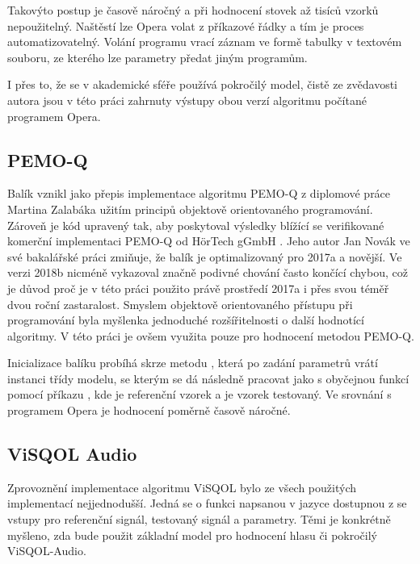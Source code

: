 Takovýto postup je časově náročný a při hodnocení stovek až tisíců vzorků nepoužitelný. Naštěstí lze Opera volat z příkazové řádky a tím je proces automatizovatelný. Volání programu  vrací záznam ve formě tabulky v textovém souboru, ze kterého lze parametry předat jiným programům.

I přes to, že se v akademické sféře používá pokročilý model, čistě ze zvědavosti autora jsou v této práci zahrnuty výstupy obou verzí algoritmu počítané programem Opera.

\subsection{PEMO-Q}

Balík  vznikl jako přepis implementace algoritmu PEMO-Q z diplomové práce Martina Zalabáka \cite{thesis:zalabak} užitím principů objektově orientovaného programování. Zároveň je kód upravený tak, aby poskytoval výsledky blížící se verifikované komerční implementaci PEMO-Q od HörTech gGmbH \cite{web:hortech}. Jeho autor Jan Novák ve své bakalářské práci \cite{thesis:novak} zmiňuje, že balík je optimalizovaný pro \matlab 2017a a novější. Ve verzi 2018b nicméně vykazoval značně podivné chování často končící chybou, což je důvod proč je v této práci použito právě prostředí 2017a i přes svou téměř dvou roční zastaralost. Smyslem objektově orientovaného přístupu při programování  byla myšlenka jednoduché rozšířitelnosti o další hodnotící algoritmy. V této práci je ovšem využita pouze pro hodnocení metodou PEMO-Q.

Inicializace balíku probíhá skrze metodu , která po zadání parametrů vrátí instanci třídy modelu, se kterým se dá následně pracovat jako s obyčejnou funkcí pomocí příkazu , kde  je referenční vzorek a  je vzorek testovaný.
Ve srovnání s programem Opera je hodnocení poměrně časově náročné.

\subsection{ViSQOL Audio}

Zprovoznění implementace algoritmu ViSQOL bylo ze všech použitých implementací nejjednodušší. Jedná se o funkci  napsanou v jazyce \matlab dostupnou z \cite{web:visqol} se vstupy pro referenční signál, testovaný signál a parametry. Těmi je konkrétně myšleno, zda bude použit základní model pro hodnocení hlasu či pokročilý ViSQOL-Audio.

